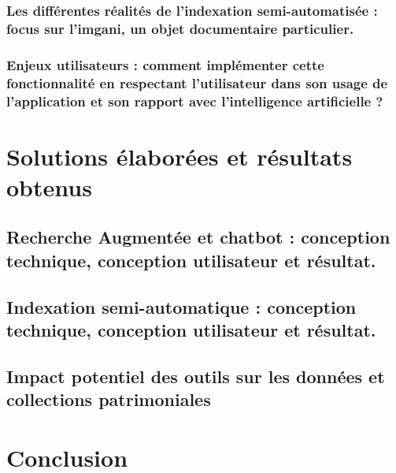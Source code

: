 \documentclass[12pt,twoside]{book}
\begin{document}
\newpage

\section[Outils et réalité technique]{Les différentes réalités de l’indexation semi-automatisée : focus sur l’\gls{imgani}, un objet documentaire particulier.}



\newpage

\section[Enjeu utilisateur et d'implémentation]{Enjeux utilisateurs : comment implémenter cette fonctionnalité en respectant l’utilisateur dans son usage de l’application et son rapport avec l’intelligence artificielle ?}




	\part{Solutions élaborées et résultats obtenus}
	
\chapter{Recherche Augmentée et \gls{chatbot} : conception technique, conception utilisateur et résultat.}



\newpage

\chapter{Indexation semi-automatique : conception technique, conception utilisateur et résultat.}



\newpage

\chapter{Impact potentiel des outils sur les données et collections patrimoniales}



	
	
\part*{Conclusion}
	
	
\end{document}
